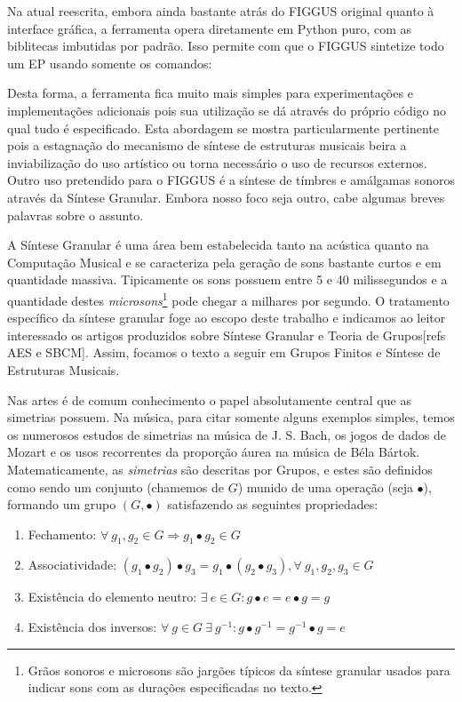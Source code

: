 Na atual reescrita, embora ainda bastante atrás do FIGGUS original quanto
à interface gráfica, a ferramenta opera diretamente em Python puro,
com as biblitecas imbutidas por padrão. Isso permite com que o FIGGUS
sintetize todo um EP usando somente os comandos:


Desta forma, a ferramenta fica muito mais simples para experimentações
e implementações adicionais pois sua utilização se dá através
do próprio código no qual tudo é especificado. Esta abordagem se mostra particularmente
pertinente pois a estagnação do mecanismo de síntese de estruturas musicais
beira a inviabilização do uso artístico ou torna necessário o uso
de recursos externos.
Outro uso pretendido para o FIGGUS
é a síntese de tímbres e amálgamas sonoros através da
Síntese Granular. Embora nosso foco seja outro, cabe algumas breves
palavras sobre o assunto.

A Síntese Granular é uma área bem estabelecida tanto na acústica quanto
na Computação Musical e se caracteriza pela geração de sons bastante curtos
e em quantidade massiva. Tipicamente os sons possuem entre 5 e 40 milissegundos
e a quantidade destes \emph{microsons}\footnote{Grãos sonoros e microsons são jargões
típicos da síntese granular usados para indicar sons com as durações especificadas
no texto.} pode chegar a milhares por segundo. O tratamento específico da
síntese granular foge ao escopo deste trabalho e indicamos ao leitor interessado
os artigos produzidos sobre Síntese Granular e Teoria de Grupos[refs AES e SBCM].
Assim, focamos o texto a seguir em Grupos Finitos e Síntese de Estruturas Musicais.

Nas artes é de comum conhecimento o papel absolutamente central
que as simetrias possuem. Na música, para citar somente alguns exemplos simples,
temos os numerosos estudos de simetrias na música de J. S. Bach, os jogos
de dados de Mozart e os usos recorrentes da proporção áurea na música
de Béla Bártok. Matematicamente, as \emph{simetrias} são descritas por Grupos,
e estes são definidos como sendo um conjunto (chamemos de $G$)
munido de uma operação (seja $\bullet$), formando um grupo $(G,\bullet)$
satisfazendo as seguintes propriedades:

\begin{enumerate}
    \item Fechamento: $\forall \ g_1, g_2  \in G \Rightarrow g_1 \bullet g_2 \in G$
    \item Associatividade: $(g_1 \bullet g_2) \bullet g_3 = g_1 \bullet (g_2 \bullet g_3), \forall \ g_1, g_2, g_3 \in G$
    \item Existência do elemento neutro: $\exists \ e \in G : g \bullet e = e \bullet g = g$
    \item Existência dos inversos: $\forall \ g \in G \ \exists \ g^{-1} : g \bullet g^{-1} = g^{-1} \bullet g = e$
\end{enumerate}

